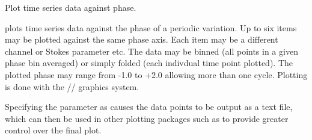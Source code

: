 \begin{manroutinedescription}
        Plot time series data against phase.

        {} plots time series data against the phase of a %
periodic
        variation. Up to six items may be plotted against the same phase
        axis. Each item may be a different channel or Stokes parameter etc.
        The data may be binned (all points in a given phase bin averaged)
        or simply folded (each indivdual time point plotted). The
        plotted phase may range from -1.0 to +2.0 allowing more than
        one cycle. Plotting is done with the {}/{}/{%
} graphics system.

        Specifying the {} parameter as {} causes the %
data points
        to be output as a text file, which can then be used in other
        plotting packages such as {} to provide greater control %
over
        the final plot.


\end{manroutinedescription}
